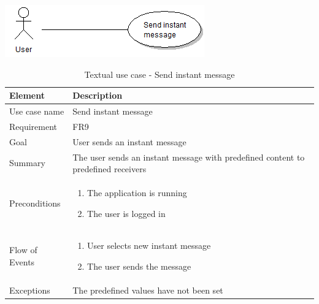 \begin{table}
\begin{center}
\begin{center}
\includegraphics[width=\textwidth]{send_instant_message}
\end{center}
\begin{tabular}{p{3cm}|p{12cm}} \hline
\textbf{Element} & \textbf{Description} \\ \hline \hline
Use case name & Send instant message \\
Requirement & FR9 \\
Goal & User sends an instant message \\ \hline
Summary & The user sends an instant message with predefined content to predefined receivers \\ \hline
Preconditions &
\begin{enumerate}
\item{}The application is running
\item{}The user is logged in
\end{enumerate} \\ \hline
Flow of Events &
\begin{enumerate}
\item{}User selects new instant message
\item{}The user sends the message
\end{enumerate} \\ \hline
Exceptions & The predefined values have not been set\\ \hline
\end{tabular}
\end{center}
\caption{Textual use case - Send instant message} \label{tab:createmessage}
\end{table}

